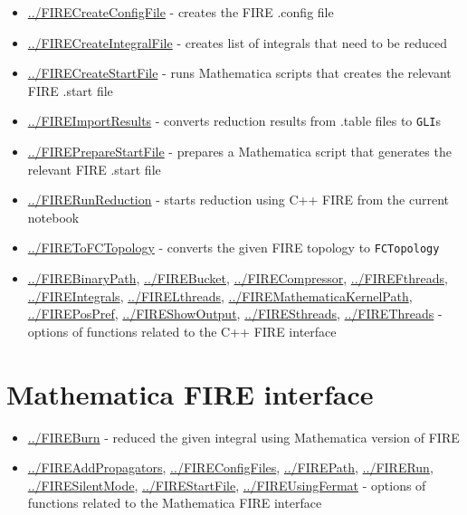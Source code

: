 \documentclass[../FeynHelpersManual.tex]{subfiles}
\begin{document}
\begin{itemize}
\tightlist
\item
  \hyperlink{../firecreateconfigfile}{../FIRECreateConfigFile} - creates
  the FIRE .config file
\item
  \hyperlink{../firecreateintegralfile}{../FIRECreateIntegralFile} -
  creates list of integrals that need to be reduced
\item
  \hyperlink{../firecreatestartfile}{../FIRECreateStartFile} - runs
  Mathematica scripts that creates the relevant FIRE .start file
\item
  \hyperlink{../fireimportresults}{../FIREImportResults} - converts
  reduction results from .table files to \texttt{GLI}s
\item
  \hyperlink{../firepreparestartfile}{../FIREPrepareStartFile} -
  prepares a Mathematica script that generates the relevant FIRE .start
  file
\item
  \hyperlink{../firerunreduction}{../FIRERunReduction} - starts
  reduction using C++ FIRE from the current notebook
\item
  \hyperlink{../firetofctopology}{../FIREToFCTopology} - converts the
  given FIRE topology to \texttt{FCTopology}
\item
  \hyperlink{../firebinarypath}{../FIREBinaryPath},
  \hyperlink{../firebucket}{../FIREBucket},
  \hyperlink{../firecompressor}{../FIRECompressor},
  \hyperlink{../firefthreads}{../FIREFthreads},
  \hyperlink{../fireintegrals}{../FIREIntegrals},
  \hyperlink{../firelthreads}{../FIRELthreads},
  \hyperlink{../firemathematicakernelpath}{../FIREMathematicaKernelPath},
  \hyperlink{../firepospref}{../FIREPosPref},
  \hyperlink{../fireshowoutput}{../FIREShowOutput},
  \hyperlink{../firesthreads}{../FIRESthreads},
  \hyperlink{../firethreads}{../FIREThreads} - options of functions
  related to the C++ FIRE interface
\end{itemize}

\hypertarget{mathematica fire interface}{
\section{Mathematica FIRE interface}\label{mathematica fire interface}}

\begin{itemize}
\tightlist
\item
  \hyperlink{../fireburn}{../FIREBurn} - reduced the given integral
  using Mathematica version of FIRE
\item
  \hyperlink{../fireaddpropagators}{../FIREAddPropagators},
  \hyperlink{../fireconfigfiles}{../FIREConfigFiles},
  \hyperlink{../firepath}{../FIREPath},
  \hyperlink{../firerun}{../FIRERun},
  \hyperlink{../firesilentmode}{../FIRESilentMode},
  \hyperlink{../firestartfile}{../FIREStartFile},
  \hyperlink{../fireusingfermat}{../FIREUsingFermat} - options of
  functions related to the Mathematica FIRE interface
\end{itemize}
\end{document}
